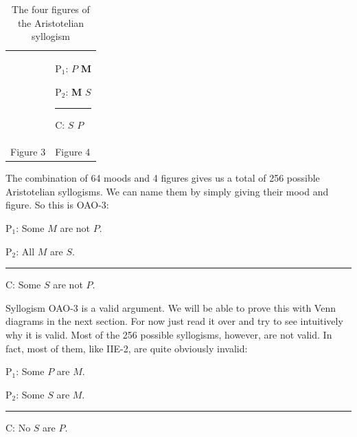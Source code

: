 \begin{table}
\begin{mdframed}[style=mytablebox]
\begin{tabu}{p{.5\linewidth}p{.5\linewidth}}
&

\begin{earg}
\item[P$_1$:] $P$ \hspace{1em} \textbf{M}
\item[P$_2$:] \textbf{M} \hspace{1em} $S$
\vspace{-.5em}
\item [] \rule{0.4\linewidth}{.5pt} 
\item[C:] \hspace{.3ex} $S$ \hspace{1em} $P$
\end{earg} 

\\

\hspace{2em} Figure 3

&

\hspace{2em} Figure 4

\end{tabu}
\end{mdframed}
\caption{The four figures of the Aristotelian syllogism}
\label{tab:four_figures}
\end{table}

The combination of 64 moods and 4 figures gives us a total of 256 possible Aristotelian syllogisms. We can name them by simply giving their mood and figure. So this is OAO-3:

\begin{earg}
\item[P$_1$:] Some $M$ are not $P$.
\item[P$_2$:] All $M$ are $S$.
\vspace{-.5em}
\item [] \rule{0.2\linewidth}{.5pt} 
\item[C:] Some $S$ are not $P$.
\end{earg} 

Syllogism OAO-3 is a valid argument. We will be able to prove this with Venn diagrams in the next section. For now just read it over and try to see intuitively why it is valid. Most of the 256 possible syllogisms, however, are not valid.  In fact, most of them, like IIE-2, are quite obviously invalid:

\begin{earg}
\item[P$_1$:] Some $P$ are $M.$
\item[P$_2$:] Some $S$ are $M.$
\vspace{-.5em}
\item [] \rule{0.2\linewidth}{.5pt} 
\item[C:] No $S$ are $P.$
\end{earg} 

